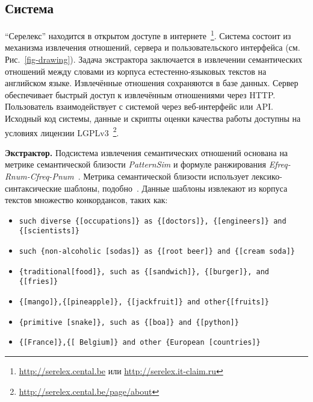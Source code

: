 \documentclass[a4paper,10pt,twoside]{article}
\begin{document}
\subsection{Система}

"`Серелекс"' находится в открытом доступе в интернете~\footnote{\url{http://serelex.cental.be} или \url{http://serelex.it-claim.ru} }.
Система состоит из механизма извлечения отношений, сервера и пользовательского интерфейса (см. Рис.~\ref{fig-drawing}). Задача экстрактора заключается в извлечении семантических отношений между словами из корпуса естестенно-языковых текстов на английском языке. Извлечённые отношения сохраняются в базе данных. Сервер обеспечивает быстрый доступ к извлечённым отношениями через HTTP. Пользователь взаимодействует с системой через веб-интерфейс или API. Исходный код системы, данные и скрипты оценки качества работы доступны на условиях лицензии LGPLv3~\footnote{ \url{http://serelex.cental.be/page/about} }.


\textbf{Экстрактор.} Подсистема извлечения семантических отношений основана на метрике семантической близости \textit{PatternSim} и формуле ранжирования \textit{Efreq-Rnum-Cfreq-Pnum}~\cite{panchenko2012konvens}. Метрика семантической близости использует лексико-синтаксические шаблоны, подобно~\cite{hearst1992}. Данные шаблоны извлекают из корпуса текстов множество конкордансов, таких как: 

\begin{itemize}
\footnotesize
\item \texttt{such diverse \{[occupations]\} as \{[doctors]\}, \{[engineers]\} and \{[scientists]\}}

\item \texttt{such \{non-alcoholic [sodas]\} as \{[root beer]\} and \{[cream 
 soda]\}}
 
\item \texttt{\{traditional[food]\}, such as \{[sandwich]\}, \{[burger]\}, and \{[fries]\}}

\item \texttt{\{[mango]\},\{[pineapple]\}, \{[jackfruit]\} and other\{[fruits]\}}

\item \texttt{\{primitive [snake]\}, such as \{[boa]\} and \{[python]\}}
\item \texttt{\{[France]\},\{[ Belgium]\} and other \{European [countries]\}}
\end{itemize}
\end{document}
